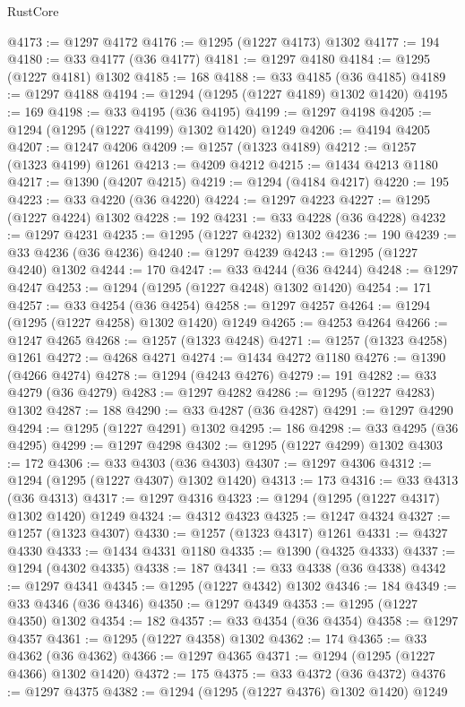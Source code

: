 \begin{lexlean}{RustCore}
\begin{coremodule}
@4173 := @1297 @4172
@4176 := @1295 (@1227 @4173) @1302
@4177 := 194
@4180 := @33 @4177 (@36 @4177)
@4181 := @1297 @4180
@4184 := @1295 (@1227 @4181) @1302
@4185 := 168
@4188 := @33 @4185 (@36 @4185)
@4189 := @1297 @4188
@4194 := @1294 (@1295 (@1227 @4189) @1302 @1420)
@4195 := 169
@4198 := @33 @4195 (@36 @4195)
@4199 := @1297 @4198
@4205 := @1294 (@1295 (@1227 @4199) @1302 @1420) @1249
@4206 := @4194 @4205
@4207 := @1247 @4206
@4209 := @1257 (@1323 @4189)
@4212 := @1257 (@1323 @4199) @1261
@4213 := @4209 @4212
@4215 := @1434 @4213 @1180
@4217 := @1390 (@4207 @4215)
@4219 := @1294 (@4184 @4217)
@4220 := 195
@4223 := @33 @4220 (@36 @4220)
@4224 := @1297 @4223
@4227 := @1295 (@1227 @4224) @1302
@4228 := 192
@4231 := @33 @4228 (@36 @4228)
@4232 := @1297 @4231
@4235 := @1295 (@1227 @4232) @1302
@4236 := 190
@4239 := @33 @4236 (@36 @4236)
@4240 := @1297 @4239
@4243 := @1295 (@1227 @4240) @1302
@4244 := 170
@4247 := @33 @4244 (@36 @4244)
@4248 := @1297 @4247
@4253 := @1294 (@1295 (@1227 @4248) @1302 @1420)
@4254 := 171
@4257 := @33 @4254 (@36 @4254)
@4258 := @1297 @4257
@4264 := @1294 (@1295 (@1227 @4258) @1302 @1420) @1249
@4265 := @4253 @4264
@4266 := @1247 @4265
@4268 := @1257 (@1323 @4248)
@4271 := @1257 (@1323 @4258) @1261
@4272 := @4268 @4271
@4274 := @1434 @4272 @1180
@4276 := @1390 (@4266 @4274)
@4278 := @1294 (@4243 @4276)
@4279 := 191
@4282 := @33 @4279 (@36 @4279)
@4283 := @1297 @4282
@4286 := @1295 (@1227 @4283) @1302
@4287 := 188
@4290 := @33 @4287 (@36 @4287)
@4291 := @1297 @4290
@4294 := @1295 (@1227 @4291) @1302
@4295 := 186
@4298 := @33 @4295 (@36 @4295)
@4299 := @1297 @4298
@4302 := @1295 (@1227 @4299) @1302
@4303 := 172
@4306 := @33 @4303 (@36 @4303)
@4307 := @1297 @4306
@4312 := @1294 (@1295 (@1227 @4307) @1302 @1420)
@4313 := 173
@4316 := @33 @4313 (@36 @4313)
@4317 := @1297 @4316
@4323 := @1294 (@1295 (@1227 @4317) @1302 @1420) @1249
@4324 := @4312 @4323
@4325 := @1247 @4324
@4327 := @1257 (@1323 @4307)
@4330 := @1257 (@1323 @4317) @1261
@4331 := @4327 @4330
@4333 := @1434 @4331 @1180
@4335 := @1390 (@4325 @4333)
@4337 := @1294 (@4302 @4335)
@4338 := 187
@4341 := @33 @4338 (@36 @4338)
@4342 := @1297 @4341
@4345 := @1295 (@1227 @4342) @1302
@4346 := 184
@4349 := @33 @4346 (@36 @4346)
@4350 := @1297 @4349
@4353 := @1295 (@1227 @4350) @1302
@4354 := 182
@4357 := @33 @4354 (@36 @4354)
@4358 := @1297 @4357
@4361 := @1295 (@1227 @4358) @1302
@4362 := 174
@4365 := @33 @4362 (@36 @4362)
@4366 := @1297 @4365
@4371 := @1294 (@1295 (@1227 @4366) @1302 @1420)
@4372 := 175
@4375 := @33 @4372 (@36 @4372)
@4376 := @1297 @4375
@4382 := @1294 (@1295 (@1227 @4376) @1302 @1420) @1249

\end{coremodule}
\end{lexlean}
